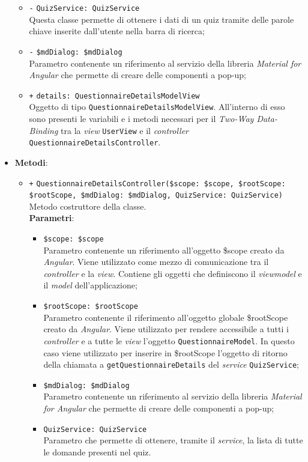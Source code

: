 \begin{itemize}
\begin{itemize}
		\item \texttt{-} \texttt{QuizService: QuizService} \\ Questa classe permette di ottenere i dati di un quiz tramite delle parole chiave inserite dall'utente nella barra di ricerca;
		\item \texttt{-} \texttt{\$mdDialog: \$mdDialog} \\
		Parametro contenente un riferimento al servizio della libreria \textit{Material for Angular} che permette di creare delle componenti a pop-up;
		\item \texttt{+} \texttt{details: QuestionnaireDetailsModelView} \\
		Oggetto di tipo \texttt{QuestionnaireDetailsModelView}. All'interno di esso sono presenti le variabili e i metodi necessari per il \textit{Two-Way Data-Binding} tra la \textit{view} \texttt{UserView} e il \textit{controller} \texttt{QuestionnaireDetailsController}.
	\end{itemize}
	\item \textbf{Metodi}:
	\begin{itemize}
		\item \texttt{+} \texttt{QuestionnaireDetailsController(\$scope: \$scope, \$rootScope: \$rootScope, \$mdDialog: \$mdDialog, QuizService: QuizService)} \\ Metodo costruttore della classe. \\
		\textbf{Parametri}: 
		\begin{itemize}
			\item \texttt{\$scope: \$scope} \\
			Parametro contenente un riferimento all'oggetto \$scope creato da \textit{Angular}. Viene utilizzato come mezzo di comunicazione tra il \textit{controller} e la \textit{view}. Contiene gli oggetti che definiscono il \textit{viewmodel} e il \textit{model} dell'applicazione;
			\item \texttt{\$rootScope: \$rootScope} \\
			Parametro contenente il riferimento all'oggetto globale \$rootScope creato da \textit{Angular}. Viene utilizzato per rendere accessibile a tutti i \textit{controller} e a tutte le \textit{view} l'oggetto \texttt{QuestionnaireModel}. In questo caso viene utilizzato per inserire in \$rootScope l'oggetto di ritorno della chiamata a \texttt{getQuestionnaireDetails} del \textit{service} \texttt{QuizService};	
			\item \texttt{\$mdDialog: \$mdDialog} \\
			Parametro contenente un riferimento al servizio della libreria \textit{Material for Angular} che permette di creare delle componenti a pop-up;
			\item \texttt{QuizService: QuizService}\\ Parametro che permette di ottenere, tramite il \textit{service}, la lista di tutte le domande presenti nel quiz.
		\end{itemize}
		

\end{itemize}
\end{itemize}
